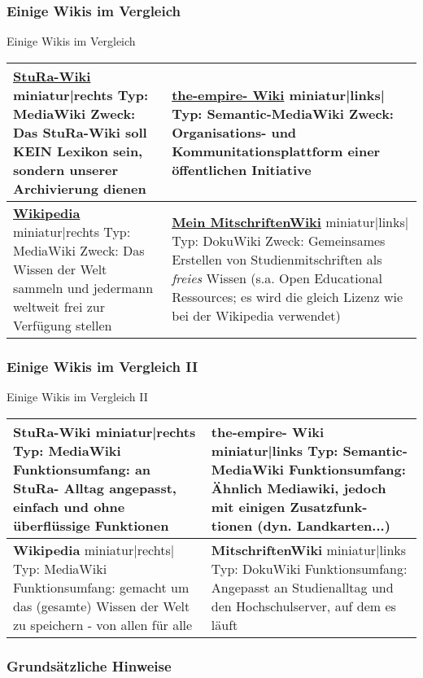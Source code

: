 \documentclass{beamer}
\begin{document}
\begin{frame}
  \frametitle{Einige Wikis im Vergleich}{Einige Wikis im Vergleich}
  \begin{longtable}{|l|l|}
  \hline
  \textbf{\href{http://wiki.stura.htw-dresden.de}{StuRa-Wiki}} miniatur|rechts Typ: MediaWiki Zweck: Das StuRa-Wiki soll KEIN Lexikon sein, sondern unserer Archivierung dienen & \textbf{\href{http://www.the-empire.de}{the-empire- Wiki}} miniatur|links| Typ: Semantic-MediaWiki Zweck: Organisations- und Kommunitationsplattform einer öffentlichen Initiative \\ 
  \hline
   
  \textbf{\href{http://www.wikipedia.de}{Wikipedia}} miniatur|rechts Typ: MediaWiki Zweck: Das Wissen der Welt sammeln und jedermann weltweit frei zur Verfügung stellen & \textbf{\href{http://www2.htw-dresden.de/~s70341/cgi-bin/dokuwiki/doku.php}{Mein MitschriftenWiki}} miniatur|links| Typ: DokuWiki Zweck: Gemeinsames Erstellen von Studienmitschriften als \emph{freies} Wissen (s.a.  Open Educational Ressources; es wird die gleich Lizenz wie bei der Wikipedia verwendet) \\ 
  \hline
   
  \end{longtable}
\end{frame}


\begin{frame}
  \frametitle{Einige Wikis im Vergleich II}{Einige Wikis im Vergleich II}
  \begin{longtable}{|l|l|}
  \hline
  \textbf{StuRa-Wiki} miniatur|rechts Typ: MediaWiki Funktionsumfang: an StuRa- Alltag angepasst, einfach und ohne überflüssige Funktionen & \textbf{the-empire- Wiki} miniatur|links Typ: Semantic-MediaWiki Funktionsumfang: Ähnlich Mediawiki, jedoch mit einigen Zusatzfunk- tionen (dyn. Landkarten...) \\ 
  \hline
   
  \textbf{Wikipedia} miniatur|rechts| Typ: MediaWiki Funktionsumfang: gemacht um das (gesamte) Wissen der Welt zu speichern - von allen für alle & \textbf{MitschriftenWiki} miniatur|links Typ: DokuWiki Funktionsumfang: Angepasst an Studienalltag und den Hochschulserver, auf dem es läuft \\ 
  \hline
   
  \end{longtable}
\end{frame}


\begin{frame}
  \frametitle{Grundsätzliche Hinweise}
\end{frame}
\end{document}
